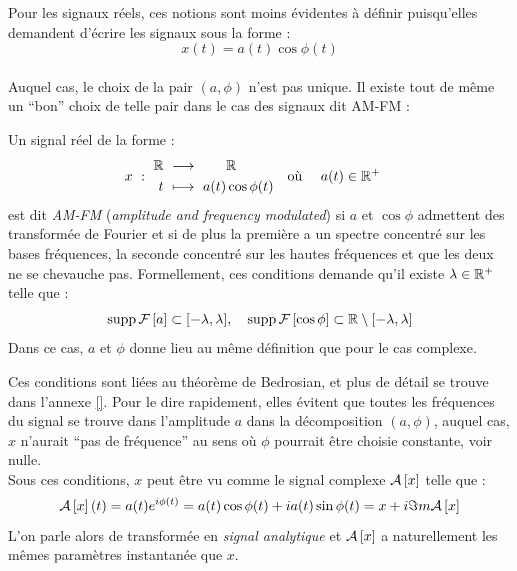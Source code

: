 Pour les signaux réels, ces notions sont moins évidentes à définir puisqu'elles demandent d'écrire les signaux sous la forme :
\[x(t) = a(t) \cos\phi(t)\]
\\
Auquel cas, le choix de la pair $(a,\phi)$ n'est pas unique. Il existe tout de même un ``bon'' choix de telle pair dans le cas des signaux dit AM-FM :
\begin{definition}[Signal AM-FM]
	Un signal réel de la forme :
	\begin{align}
		x\ &:\ \begin{aligned}\mathbb{R}\ &\longrightarrow\qquad \mathbb{R} \\
			t\ &\longmapsto\ a(t) \cos\phi(t)
		\end{aligned}  &  \text{où }\quad a(t)\in\mathbb{R}^+\quad
	\end{align}
	est dit \emph{AM-FM} (\emph{amplitude and frequency modulated}) si $a$ et $\cos\phi$ admettent des transformée de Fourier et si de plus la première a un spectre concentré sur les bases fréquences, la seconde concentré sur les hautes fréquences et que les deux ne se chevauche pas.
	Formellement, ces conditions demande qu'il existe $\lambda\in\mathbb{R}^+$ telle que :
	\begin{equation}\label{eq:condi_AM-FM}
		\text{\normalfont supp}\, \mathcal{F}\left[a\right] \subset [-\lambda, \lambda],\quad \text{\normalfont supp}\, \mathcal{F}\left[\cos\phi\right] \subset \mathbb{R}\setminus[-\lambda,\lambda]
	\end{equation}
	Dans ce cas, $a$ et $\phi$ donne lieu au même définition que pour le cas complexe.
\end{definition}
\skipl
Ces conditions sont liées au théorème de Bedrosian, et plus de détail se trouve dans l'annexe \ref{}. Pour le dire rapidement, elles évitent que toutes les fréquences du signal se trouve dans l'amplitude $a$ dans la décomposition $(a,\phi)$, auquel cas, $x$ n'aurait ``pas de fréquence'' au sens où $\phi$ pourrait être choisie constante, voir nulle.
\\
Sous ces conditions, $x$ peut être vu comme le signal complexe $\mathcal{A}\left[x\right]$ telle que :
\[\mathcal{A}\left[x\right](t) = a(t) e^{i\phi(t)}= a(t)\cos\phi(t) + ia(t)\sin\phi(t) = x  + i\Im m \mathcal{A}\left[x\right]\]
L'on parle alors de transformée en \emph{signal analytique} et $\mathcal{A}\left[x\right]$ a naturellement les mêmes paramètres instantanée que $x$.
\\



